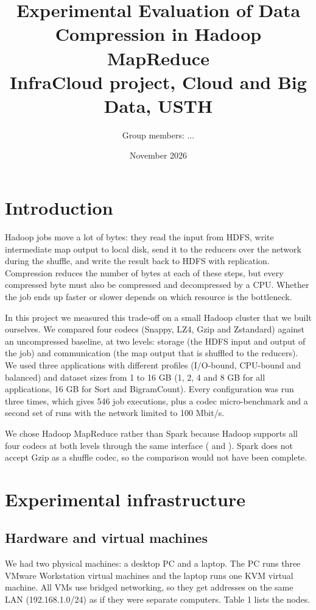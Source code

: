 \documentclass[11pt,a4paper]{article}
\title{Experimental Evaluation of Data Compression in Hadoop MapReduce\\[4pt]\large InfraCloud project, Cloud and Big Data, USTH}
\author{Group members: ...}
\date{November 2026}
\begin{document}
\maketitle
\tableofcontents
\newpage

\section{Introduction}
Hadoop jobs move a lot of bytes: they read the input from HDFS, write intermediate map output to local disk, send it to the reducers over the network during the shuffle, and write the result back to HDFS with replication. Compression reduces the number of bytes at each of these steps, but every compressed byte must also be compressed and decompressed by a CPU. Whether the job ends up faster or slower depends on which resource is the bottleneck.

In this project we measured this trade-off on a small Hadoop cluster that we built ourselves. We compared four codecs (Snappy, LZ4, Gzip and Zstandard) against an uncompressed baseline, at two levels: storage (the HDFS input and output of the job) and communication (the map output that is shuffled to the reducers). We used three applications with different profiles (I/O-bound, CPU-bound and balanced) and dataset sizes from 1 to 16 GB (1, 2, 4 and 8 GB for all applications, 16 GB for Sort and BigramCount). Every configuration was run three times, which gives 546 job executions, plus a codec micro-benchmark and a second set of runs with the network limited to 100 Mbit/s.

We chose Hadoop MapReduce rather than Spark because Hadoop supports all four codecs at both levels through the same  interface ( and ). Spark does not accept Gzip as a shuffle codec, so the comparison would not have been complete.

\section{Experimental infrastructure}
\subsection{Hardware and virtual machines}
We had two physical machines: a desktop PC and a laptop. The PC runs three VMware Workstation virtual machines and the laptop runs one KVM virtual machine. All VMs use bridged networking, so they get addresses on the same LAN (192.168.1.0/24) as if they were separate computers. Table 1 lists the nodes.
\end{document}
